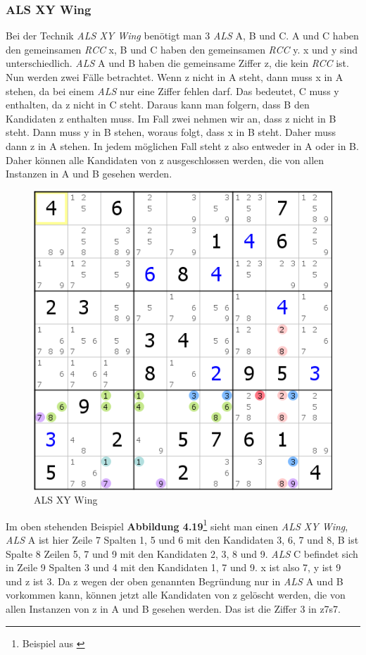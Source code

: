 \newpage
\subsubsection{ALS XY Wing}
Bei der Technik \textit{ALS XY Wing} benötigt man 3 \textit{ALS} A, B und C. A und C haben den gemeinsamen \textit{RCC} x, B und C haben den gemeinsamen \textit{RCC} y. x und y sind unterschiedlich. \textit{ALS} A und B haben die gemeinsame Ziffer z, die kein \textit{RCC} ist.\\
Nun werden zwei Fälle betrachtet. Wenn z nicht in A steht, dann muss x in A stehen, da bei einem \textit{ALS} nur eine Ziffer fehlen darf. Das bedeutet, C muss y enthalten, da z nicht in C steht. Daraus kann man folgern, dass B den Kandidaten z enthalten muss. Im Fall zwei nehmen wir an, dass z nicht in B steht. Dann muss y in B stehen, woraus folgt, dass x in B steht. Daher muss dann z in A stehen. In jedem möglichen Fall steht z also entweder in A oder in B. Daher können alle Kandidaten von z ausgeschlossen werden, die von allen Instanzen in A und B gesehen werden.

\begin{figure}[h]
\begin{center}
\includegraphics{./img/ALS_XY_Wing.png}
\caption{ALS XY Wing}
\end{center}
\end{figure}

\noindent Im oben stehenden Beispiel \textbf{Abbildung 4.19}\footnote{Beispiel aus \cite{HDKALSXYWing}} sieht man einen \textit{ALS XY Wing}, \textit{ALS} A ist hier Zeile 7 Spalten 1, 5 und 6 mit den Kandidaten 3, 6, 7 und 8, B ist Spalte 8 Zeilen 5, 7 und 9 mit den Kandidaten 2, 3, 8 und 9. \textit{ALS} C befindet sich in Zeile 9 Spalten 3 und 4 mit den Kandidaten 1, 7 und 9. x ist also 7, y ist 9 und z ist 3. Da z wegen der oben genannten Begründung nur in \textit{ALS} A und B vorkommen kann, können jetzt alle Kandidaten von z gelöscht werden, die von allen Instanzen von z in A und B gesehen werden. Das ist die Ziffer 3 in z7s7.